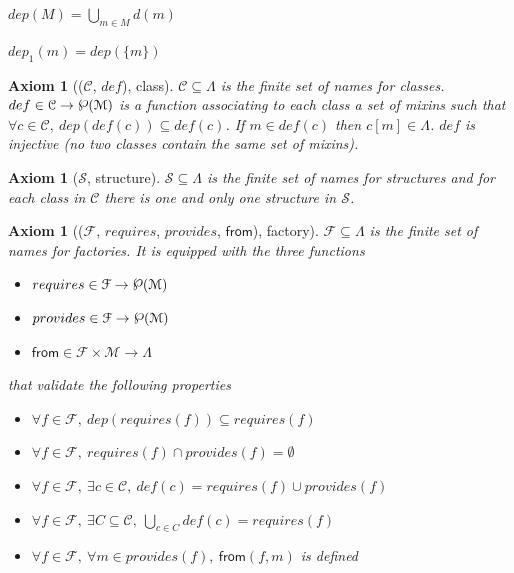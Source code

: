 \documentclass[a4paper,UKenglish,cleveref, autoref]{lipics-v2019}
\newcommand{\Lang}{\ensuremath{\Lambda}}
\newcommand{\mixins}{mixins}
\newcommand{\M}{\ensuremath{\mathcal{M}}}
\newcommand{\factory}{factory}
\newcommand{\factories}{factories}
\newcommand{\F}{\ensuremath{\mathcal{F}}}
\newcommand{\depx}{\ensuremath{d}}
\newcommand{\dep}{\ensuremath{dep}}
\newcommand{\depone}{\ensuremath{dep_1}}
\newcommand{\powerset}[1]{\raisebox{.15\baselineskip}{\Large\ensuremath{\wp}}(#1)}
\newcommand{\C}{\ensuremath{\mathcal{C}}}
\newcommand{\class}{class}
\newcommand{\classes}{classes}
\newcommand{\cdef}{\ensuremath{def}}
\newcommand{\Str}{\ensuremath{\mathcal{S}}}
\newcommand{\structure}{structure}
\newcommand{\structures}{structures}
\newcommand{\requires}{\ensuremath{requires}}
\newcommand{\provides}{\ensuremath{provides}}
\newcommand{\from}{\ensuremath{\mathsf{from}}}
\newcommand{\proj}[2]{\ensuremath{#1[#2]}}
\theoremstyle{implem}
\theoremstyle{implem}
\newcounter{axiomcounter}
\theoremstyle{axiom}
\newtheorem{axiom}[axiomcounter]{Axiom}
\theoremstyle{abscommand}
\theoremstyle{command}
\begin{document}
\begin{definition}[\(\dep \in \powerset{\M{}} \to \powerset\M{}\)]\label{def:depxs}
\(
  \dep{}(M) = \bigcup_{m \in M} \depx (m)
\)
\end{definition}

\begin{definition}[\(\depone{} \in \M{} \to \powerset\M{}\)]\label{def:dep}
\(\depone{}(m) = \dep{}(\{m\})\)
\end{definition}

\begin{axiom}[(\C{}, \cdef{}), \class{}]\label{def:class}
\(\C{} \subseteq \Lang{}\) is the finite set of names for \classes{}.
\(\cdef{} \in \C \to \powerset\M{}\) is a function associating to
each \class{} a set of \mixins{}
such that \(\forall c \in \C{},~ \dep{}(\cdef{}(c)) \subseteq \cdef{}(c)\).
If \(m \in \cdef{}(c) \) then \( \proj{c}{m} \in \Lang{} \).
\cdef{} is injective (no two \classes{} contain the same set of \mixins{}).
\end{axiom}

\begin{axiom}[\Str{}, \structure{}]\label{def:structure}
\(\Str{} \subseteq \Lang{} \) is the finite set of names for \structures{}
and for each \class{} in \C{} there is one and only one \structure{}
in \Str{}.
\end{axiom}

\begin{axiom}[(\F{}, \requires{}, \provides{}, \from{}), \factory{}]\label{def:factory}
  \(\F{} \subseteq \Lang{} \) is the finite set of names for \factories{}.
  It is equipped with the three functions
  \begin{itemize}
    \item\( \requires{} \in \F{} \to \powerset\M{} \)
    \item\( \provides{} \in \F{} \to \powerset\M{} \)
    \item\( \from{} \in \F{} \times \M{} \to \Lang{} \)
  \end{itemize}
  that validate the following properties
  \begin{itemize}
    \item\( \forall f \in \F{},~ \dep{}(\requires{}(f)) \subseteq \requires{}(f)\)
    \item\( \forall f \in \F{},~ \requires{}(f) \cap \provides{}(f) = \emptyset \)
    \item\( \forall f \in \F{},~\exists c \in \C{},~ \cdef{}(c) = \requires{}(f) \cup \provides{}(f) \)
    \item\( \forall f \in \F{},~\exists C \subseteq \C{},~\bigcup_{c\in C}\cdef{}(c) = \requires{}(f)\)
    \item\( \forall f \in \F{},~\forall m \in \provides{}(f),~ \from{}(f,m) \) is defined
  \end{itemize}
\end{axiom}
\end{document}
